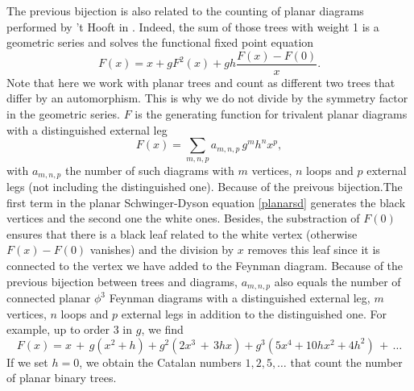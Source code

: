 \documentclass[10pt,here,feynmf]{article}
\begin{document}
The previous bijection is also related to the counting of planar diagrams performed by 't Hooft in \cite{counting}. Indeed, the sum of those trees with weight 1 is a geometric series and solves the functional fixed point equation 
\begin{equation}
F(x)=x+gF^{2}(x)+gh\frac{F(x)-F(0)}{x}.\label{planarsd}
\end{equation}
Note that here  we work with planar trees and count as different two trees that differ by an automorphism. This is why we do not divide by the symmetry factor in the geometric series. 
$F$ is the generating function for trivalent planar diagrams with a distinguished external leg
\begin{equation}
F(x)=\sum_{m,n,p}a_{m,n,p}\,g^{m}h^{n}x^{p},
\end{equation}
with $a_{m,n,p}$ the number of such diagrams with $m$ vertices, $n$ loops and $p$ external legs (not including the distinguished one). Because of the preivous bijection.The first term in the planar Schwinger-Dyson equation \eqref{planarsd} generates the black vertices and the second one the white ones. Besides, the substraction of $F(0)$ ensures that there is a  black leaf related to the white vertex (otherwise $F(x)-F(0)$ vanishes) and the division by $x$ removes this leaf since it is connected to the vertex we have added to the Feynman diagram.  Because of the previous bijection between trees and diagrams, $a_{m,n,p}$ also equals the number of connected planar $\phi^{3}$ Feynman diagrams with a distinguished external leg, $m$ vertices, $n$ loops and $p$ external legs in addition to the distinguished one. For example, up to order 3 in $g$, we find
\begin{equation}
F(x)=x\,+\,g(x^{2}+h)+g^{2}(2x^{3}\,+\,3hx)+g^{3}(5x^{4}+10hx^{2}+4h^{2})\,+\,\dots
\end{equation}
If we set $h=0$, we obtain the Catalan numbers $1,2,5,\dots$ that count the number of planar binary trees. 






\end{document}
